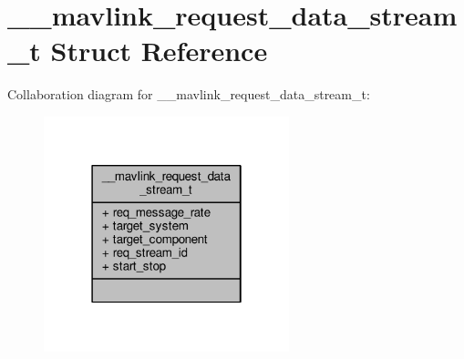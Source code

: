 \hypertarget{struct____mavlink__request__data__stream__t}{\section{\+\_\+\+\_\+mavlink\+\_\+request\+\_\+data\+\_\+stream\+\_\+t Struct Reference}
\label{struct____mavlink__request__data__stream__t}
}


Collaboration diagram for \+\_\+\+\_\+mavlink\+\_\+request\+\_\+data\+\_\+stream\+\_\+t\+:
\nopagebreak
\begin{figure}[H]
\begin{center}
\leavevmode
\includegraphics[width=202pt]{struct____mavlink__request__data__stream__t__coll__graph}
\end{center}
\end{figure}
